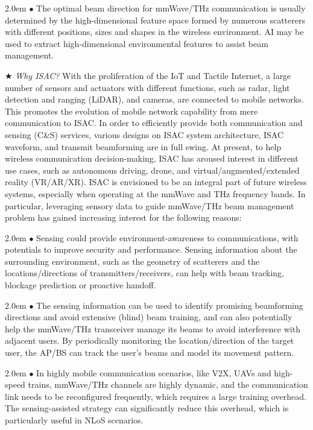 \documentclass[journal,comsoc]{IEEEtran}
\begin{document}
\hangindent 2.0em
$\bullet$ The optimal beam direction for mmWave/THz communication is usually determined by the high-dimensional feature space formed by numerous scatterers with different positions, sizes and shapes in the wireless environment. AI may be used to extract high-dimensional environmental features to assist beam management.



$\bigstar$ \emph{Why ISAC?} With the proliferation of the IoT and Tactile Internet, a large number of sensors and actuators with different functions, such as radar, light detection and ranging (LiDAR), and cameras, are connected to mobile networks. This promotes the evolution of mobile network capability from mere communication to ISAC. In order to efficiently provide both communication and sensing (C\&S) services, various designs on ISAC system architecture, ISAC waveform, and transmit beamforming are in full swing. At present, to help wireless communication decision-making, ISAC has aroused interest in different use cases, such as autonomous driving, drone, and virtual/augmented/extended reality (VR/AR/XR). ISAC is envisioned to be an integral part of future wireless systems, especially when operating at the mmWave and THz frequency bands. In particular, leveraging sensory data to guide mmWave/THz beam management problem has gained increasing interest for the following reasons:

\hangindent 2.0em
$\bullet$ Sensing could provide environment-awareness to communications, with potentials to improve security and performance. Sensing information about the surrounding environment, such as the geometry of scatterers and the locations/directions of transmitters/receivers, can help with beam tracking, blockage prediction or proactive handoff.

\hangindent 2.0em
$\bullet$ The sensing information can be used to identify promising beamforming directions and avoid extensive (blind) beam training, and can also potentially help the mmWave/THz transceiver manage its beams to avoid interference with adjacent users. By periodically monitoring the location/direction of the target user, the AP/BS can track the user's beams and model its movement pattern.

\hangindent 2.0em
$\bullet$ In highly mobile communication scenarios, like V2X, UAVs \cite{Unmanned-Aerial-Vehicle-Wireless-Networks} and high-speed trains, mmWave/THz channels are highly dynamic, and the communication link needs to be reconfigured frequently, which requires a large training overhead. The sensing-assisted strategy can significantly reduce this overhead, which is particularly useful in NLoS scenarios.
\end{document}
